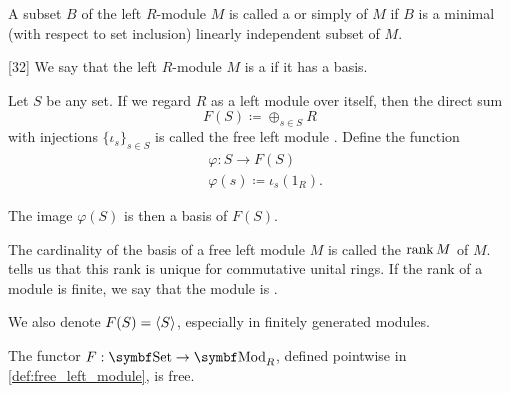 \begin{definition}\label{def:left_module_hamel_basis}
  A subset \( B \) of the left \( R \)-module \( M \) is called a  or simply  of \( M \) if \( B \) is a minimal (with respect to set inclusion) linearly independent subset of \( M \).
\end{definition}

\begin{definition}\label{def:free_left_module}[32]\cite[377]{Knapp2016BAlg}
  We say that the left \( R \)-module \( M \) is a  if it has a basis.

  Let \( S \) be any set. If we regard \( R \) as a left module over itself, then the direct sum
  \begin{equation*}
    F(S) \coloneqq \oplus_{s \in S} R
  \end{equation*}
  with injections \( \{ \iota_s \}_{s \in S} \) is called the free left module . Define the function
  \begin{align*}
    &\varphi: S \to F(S) \\
    &\varphi(s) \coloneqq \iota_s(1_R).
  \end{align*}

  The image \( \varphi(S) \) is then a basis of \( F(S) \).

  The cardinality of the basis of a free left module \( M \) is called the  \( \operatorname{rank} M \) of \( M \).  tells us that this rank is unique for commutative unital rings. If the rank of a module is finite, we say that the module is .

  We also denote \( F(S) = \left\langle S \right\rangle \), especially in finitely generated modules.
\end{definition}

\begin{proposition}\label{thm:free_module_is_free_functor}
  The functor \( F: \Cat{Set} \to \Cat{Mod}_R \), defined pointwise in \cref{def:free_left_module}, is free.
\end{proposition}

